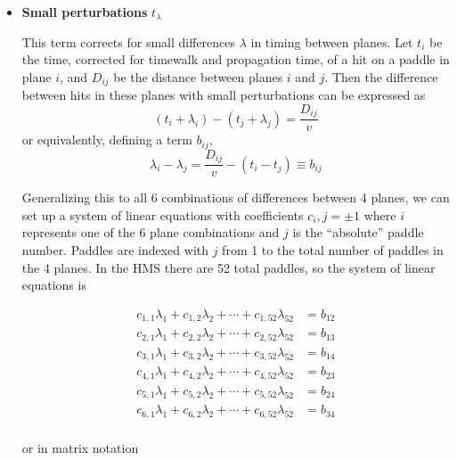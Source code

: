 \begin{itemize}
    \item \textbf{Small perturbations} $t_{\lambda}$

This term corrects for small differences $\lambda$ in timing between planes.
Let $t_i$ be the time, corrected for timewalk and propagation time,
of a hit on a paddle in plane $i$,
and $D_{ij}$ be the distance between planes $i$ and $j$.
Then the difference between hits in these planes with small perturbations can
be expressed as
\begin{equation}
    (t_i+\lambda_i) - (t_j+\lambda_j) = \frac{D_{ij}}{v}
\end{equation}
or equivalently, defining a term $b_{ij}$,
\begin{equation}
    \lambda_i - \lambda_j = \frac{D_{ij}}{v} - (t_i - t_j) \equiv b_{ij}
\end{equation}

Generalizing this to all 6 combinations of differences between 4 planes, we can
set up a system of linear equations with coefficients $c_i,j=\pm1$ where $i$
represents one of the 6 plane combinations and $j$ is the ``absolute'' paddle
number.
Paddles are indexed with $j$ from 1 to the total number of paddles in the
4 planes.
In the HMS there are 52 total paddles, so the system of linear equations is

\begin{align}
    c_{1,1}\lambda_1 + c_{1,2}\lambda_2 + \cdots + c_{1,52}\lambda_52 &= b_{12} \\
    c_{2,1}\lambda_1 + c_{2,2}\lambda_2 + \cdots + c_{2,52}\lambda_52 &= b_{13} \\
    c_{3,1}\lambda_1 + c_{3,2}\lambda_2 + \cdots + c_{3,52}\lambda_52 &= b_{14} \\
    c_{4,1}\lambda_1 + c_{4,2}\lambda_2 + \cdots + c_{4,52}\lambda_52 &= b_{23} \\
    c_{5,1}\lambda_1 + c_{5,2}\lambda_2 + \cdots + c_{5,52}\lambda_52 &= b_{24} \\
    c_{6,1}\lambda_1 + c_{6,2}\lambda_2 + \cdots + c_{6,52}\lambda_52 &= b_{34} \\
\end{align}

or in matrix notation


\end{itemize}
